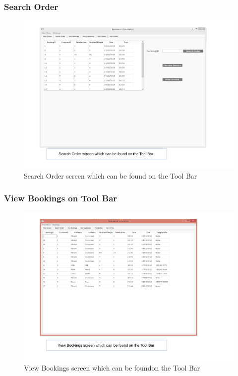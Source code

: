 \begin{landscape}
\subsubsection{Search Order}
\begin{figure}[H]
    \includegraphics[width = 15cm]{./Maintenance/images/screen17}
    \caption{Search Order screen which can be found on the Tool Bar} \label{fig:screen17}
\end{figure}

\subsubsection{View Bookings on Tool Bar}
\begin{figure}[H]
    \includegraphics[width = 15cm]{./Maintenance/images/screen18}
    \caption{View Bookings screen which can be foundon the Tool Bar} \label{fig:screen18}
\end{figure}


\end{landscape}
